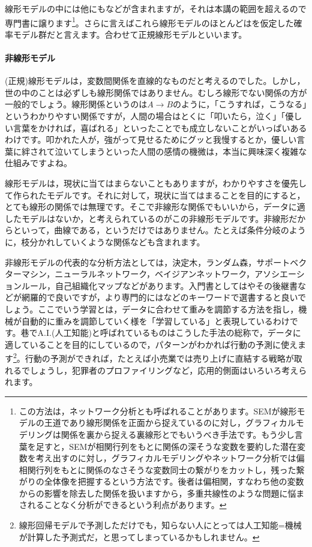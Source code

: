 \documentclass{ltjsbook}
\begin{document}
線形モデルの中には他にも\textcite{Miyagawa1997}などが含まれますが，それは本講の範囲を超えるので専門書に譲ります\footnote{この方法は，ネットワーク分析とも呼ばれることがあります\parencite{NetworkPsychometrics}。SEMが線形モデルの王道であり線形関係を正面から捉えているのに対し，グラフィカルモデリングは関係を裏から捉える裏線形とでもいうべき手法です。もう少し言葉を足すと，SEMが相関行列をもとに関係の深そうな変数を要約した潜在変数を考え出すのに対し，グラフィカルモデリングやネットワーク分析では偏相関行列をもとに関係のなさそうな変数同士の繋がりをカットし，残った繋がりの全体像を把握するという方法です。後者は偏相関，すなわち他の変数からの影響を除去した関係を扱いますから，多重共線性のような問題に悩まされることなく分析ができるという利点があります。}。さらに言えばこれら線形モデルのほとんどはを仮定した確率モデル群だと言えます。合わせて正規線形モデルといいます。


\paragraph{非線形モデル}
(正規)線形モデルは，変数間関係を直線的なものだと考えるのでした。しかし，世の中のことは必ずしも線形関係ではありません。むしろ線形でない関係の方が一般的でしょう。線形関係というのは$A \to B$のように，「こうすれば，こうなる」というわかりやすい関係ですが，人間の場合はとくに「叩いたら，泣く」「優しい言葉をかければ，喜ばれる」といったことでも成立しないことがいっぱいあるわけです。叩かれた人が，強がって見せるためにグッと我慢するとか，優しい言葉に絆されて泣いてしまうといった人間の感情の機微は，本当に興味深く複雑な仕組みですよね。

線形モデルは，現状に当てはまらないこともありますが，わかりやすさを優先して作られたモデルです。それに対して，現状に当てはまることを目的にすると，とても線形の関係では無理です。そこで非線形な関係でもいいから，データに適したモデルはないか，と考えられているのがこの非線形モデルです。非線形だからといって，曲線である，というだけではありません。たとえば条件分岐のように，枝分かれしていくような関係なども含まれます。

非線形モデルの代表的な分析方法としては，決定木，ランダム森，サポートベクターマシン，ニューラルネットワーク，ベイジアンネットワーク，アソシエーションルール，自己組織化マップなどがあります。入門書としては\textcite{Toyoda2008}やその後継書\textcite{Toyoda2023}などが網羅的で良いですが，より専門的にはなどのキーワードで選書すると良いでしょう。ここでいう学習とは，データに合わせて重みを調節する方法を指し，機械が自動的に重みを調節していく様を「学習している」と表現しているわけです。巷でA.I.(人工知能)と呼ばれているものはこうした手法の総称で，データに適していることを目的にしているので，パターンがわかれば行動の予測に使えます\footnote{線形回帰モデルで予測しただけでも，知らない人にとっては人工知能=機械が計算した予測式だ，と思ってしまっているかもしれません。}。行動の予測ができれば，たとえば小売業では売り上げに直結する戦略が取れるでしょうし，犯罪者のプロファイリングなど，応用的側面はいろいろ考えられます。
\end{document}
